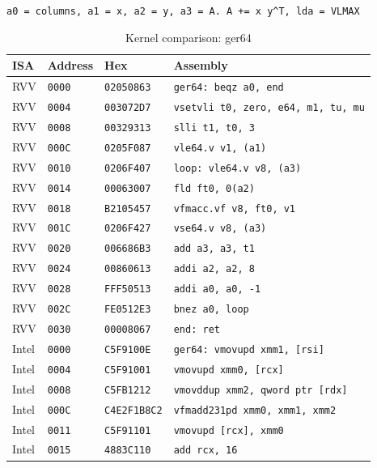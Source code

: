 \begin{table}[htbp]
\centering
\caption{Kernel comparison: ger64}
\begingroup
\scriptsize
\setlength{\tabcolsep}{4pt}
\noindent \texttt{a0 = columns, a1 = x, a2 = y, a3 = A. A += x y\textasciicircum{}T, lda = VLMAX}\par
\vspace{0.6ex}
\begin{tabular}{@{}l|l|l|p{7.2cm}@{}}
\toprule
ISA & Address & Hex & Assembly \\
\midrule
RVV & \texttt{0000} & \texttt{02050863} & \texttt{ger64: beqz a0, end} \\
RVV & \texttt{0004} & \texttt{003072D7} & \texttt{vsetvli t0, zero, e64, m1, tu, mu} \\
RVV & \texttt{0008} & \texttt{00329313} & \texttt{slli t1, t0, 3} \\
RVV & \texttt{000C} & \texttt{0205F087} & \texttt{vle64.v v1, (a1)} \\
RVV & \texttt{0010} & \texttt{0206F407} & \texttt{loop: vle64.v v8, (a3)} \\
RVV & \texttt{0014} & \texttt{00063007} & \texttt{fld ft0, 0(a2)} \\
RVV & \texttt{0018} & \texttt{B2105457} & \texttt{vfmacc.vf v8, ft0, v1} \\
RVV & \texttt{001C} & \texttt{0206F427} & \texttt{vse64.v v8, (a3)} \\
RVV & \texttt{0020} & \texttt{006686B3} & \texttt{add a3, a3, t1} \\
RVV & \texttt{0024} & \texttt{00860613} & \texttt{addi a2, a2, 8} \\
RVV & \texttt{0028} & \texttt{FFF50513} & \texttt{addi a0, a0, -1} \\
RVV & \texttt{002C} & \texttt{FE0512E3} & \texttt{bnez a0, loop} \\
RVV & \texttt{0030} & \texttt{00008067} & \texttt{end: ret} \\
\midrule
Intel & \texttt{0000} & \texttt{C5F9100E} & \texttt{ger64: vmovupd xmm1, [rsi]} \\
Intel & \texttt{0004} & \texttt{C5F91001} & \texttt{vmovupd xmm0, [rcx]} \\
Intel & \texttt{0008} & \texttt{C5FB1212} & \texttt{vmovddup xmm2, qword ptr [rdx]} \\
Intel & \texttt{000C} & \texttt{C4E2F1B8C2} & \texttt{vfmadd231pd xmm0, xmm1, xmm2} \\
Intel & \texttt{0011} & \texttt{C5F91101} & \texttt{vmovupd [rcx], xmm0} \\
Intel & \texttt{0015} & \texttt{4883C110} & \texttt{add rcx, 16} \\

\end{tabular}
\end{table}
